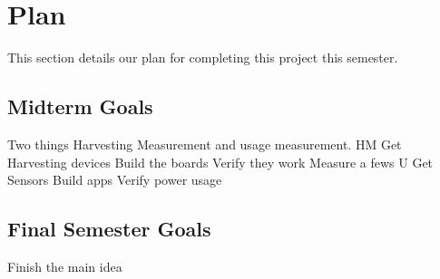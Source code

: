 \section{Plan} %
\label{sec:plan}

This section details our plan for completing this project this semester.

\subsection{Midterm Goals}
Two things Harvesting Measurement and usage measurement.
HM
Get Harvesting devices
Build the boards
Verify they work
Measure a fews
U
Get Sensors
Build apps
Verify power usage

\subsection{Final Semester Goals}
 Finish the main idea
